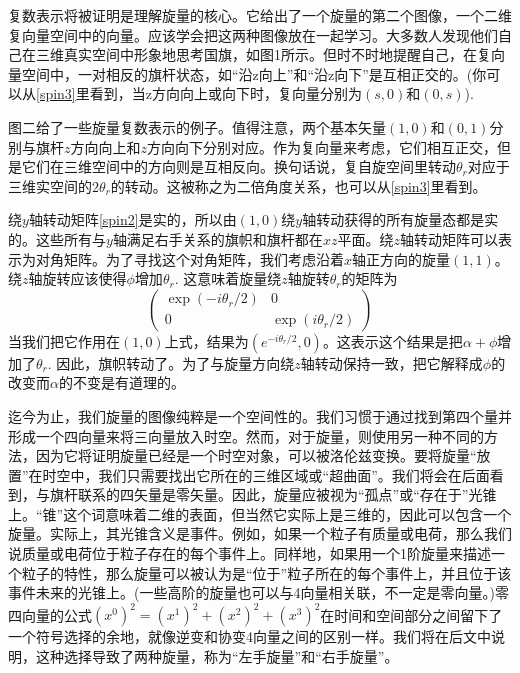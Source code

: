 \documentclass[a4paper,12pt]{article}
\begin{document}
    复数表示将被证明是理解旋量的核心。它给出了一个旋量的第二个图像，一个二维复向量空间中的向量。应该学会把这两种图像放在一起学习。大多数人发现他们自己在三维真实空间中形象地思考国旗，如图1所示。但时不时地提醒自己，在复向量空间中，一对相反的旗杆状态，如“沿z向上”和“沿z向下”是互相正交的。(你可以从\eqref{spin3}里看到，当z方向向上或向下时，复向量分别为$(s,0)$和$(0,s)$).

    图二给了一些旋量复数表示的例子。值得注意，两个基本矢量$(1,0)$和$(0,1)$分别与旗杆$z$方向向上和$z$方向向下分别对应。作为复向量来考虑，它们相互正交，但是它们在三维空间中的方向则是互相反向。换句话说，复自旋空间里转动$\theta_r$对应于三维实空间的$2\theta_r$的转动。这被称之为二倍角度关系，也可以从\eqref{spin3}里看到。

    绕$y$轴转动矩阵\eqref{spin2}是实的，所以由$(1,0)$绕$y$轴转动获得的所有旋量态都是实的。这些所有与$y$轴满足右手关系的旗帜和旗杆都在$xz$平面。绕$z$轴转动矩阵可以表示为对角矩阵。为了寻找这个对角矩阵，我们考虑沿着$x$轴正方向的旋量$(1,1)$。绕$z$轴旋转应该使得$\phi$增加$\theta_r$. 这意味着旋量绕$z$轴旋转$\theta_r$的矩阵为
    \begin{equation}
        \left(\begin{array}{cc}
            \exp \left(-i \theta_{r} / 2\right) & 0 \\
            0 & \exp \left(i \theta_{r} / 2\right)
            \end{array}\right)
    \end{equation}
    当我们把它作用在$(1,0)$上式，结果为$(e^{-i\theta_r/2},0)$。这表示这个结果是把$\alpha+\phi$增加了$\theta_r$. 因此，旗帜转动了。为了与旋量方向绕$z$轴转动保持一致，把它解释成$\phi$的改变而$\alpha$的不变是有道理的。

    迄今为止，我们旋量的图像纯粹是一个空间性的。我们习惯于通过找到第四个量并形成一个四向量来将三向量放入时空。然而，对于旋量，则使用另一种不同的方法，因为它将证明旋量已经是一个时空对象，可以被洛伦兹变换。要将旋量“放置”在时空中，我们只需要找出它所在的三维区域或“超曲面”。我们将会在后面看到，与旗杆联系的四矢量是零矢量。因此，旋量应被视为“孤点”或“存在于”光锥上。“锥”这个词意味着二维的表面，但当然它实际上是三维的，因此可以包含一个旋量。实际上，其光锥含义是事件。例如，如果一个粒子有质量或电荷，那么我们说质量或电荷位于粒子存在的每个事件上。同样地，如果用一个1阶旋量来描述一个粒子的特性，那么旋量可以被认为是“位于”粒子所在的每个事件上，并且位于该事件未来的光锥上。(一些高阶的旋量也可以与4向量相关联，不一定是零向量。)零四向量的公式$(x^0)^2=(x^1)^2+(x^2)^2+(x^3)^2$在时间和空间部分之间留下了一个符号选择的余地，就像逆变和协变4向量之间的区别一样。我们将在后文中说明，这种选择导致了两种旋量，称为“左手旋量”和“右手旋量”。
\end{document}
